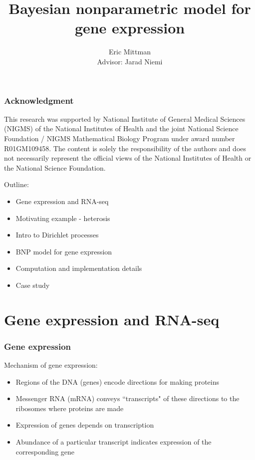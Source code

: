 \documentclass{beamer}
\title{Bayesian nonparametric model for gene expression}
\author{Eric Mittman \\ \vspace{.5cm} Advisor: Jarad Niemi}
\begin{document}
\frame{\titlepage}

\begin{frame}%
  \frametitle{Acknowledgment}
  \small%
  This research was supported by National Institute of General Medical Sciences (NIGMS) of the National Institutes of Health and the joint National Science Foundation / NIGMS Mathematical Biology Program under award number R01GM109458. The content is solely the responsibility of the authors and does not necessarily represent the official views of the National Institutes of Health or the National Science Foundation.
\end{frame}


\begin{frame}
Outline:
\begin{itemize}
  \item Gene expression and RNA-seq
  \item Motivating example - heterosis
  \item Intro to Dirichlet processes
  \item BNP model for gene expression
  \item Computation and implementation details
  \item Case study
\end{itemize}
\end{frame}


\section[GE/RNA-seq]{Gene expression and RNA-seq}

\begin{frame}%
  \frametitle{Gene expression}
  Mechanism of gene expression:
  \begin{itemize}
    \item Regions of the DNA (genes) encode directions for making proteins
    \item Messenger RNA (mRNA) conveys ``transcripts" of these directions to the ribosomes where proteins are made
    \item Expression of genes depends on transcription
    \item Abundance of a particular transcript indicates expression of the corresponding gene
  \end{itemize}
  
  
  {\scriptsize \citep[\textit{Statistical Analysis of Next Generation Sequencing Data}]{datta2014}}
\end{frame}
\end{document}
